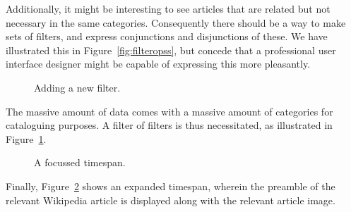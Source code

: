 Additionally, it might be interesting to see articles that are related but not 
necessary in the same categories. Consequently there should be a way to make 
sets of filters, and express conjunctions and disjunctions of these. We have 
illustrated this in Figure~\ref{fig:filteropss}, but concede that a 
professional user interface designer might be capable of expressing this more 
pleasantly.

\begin{figure}[H]
  \centering
  \begin{scale}{0.5}
    
  \end{scale}
  \caption{Adding a new filter.}
  \label{fig:filters}
\end{figure}

The massive amount of data comes with a massive amount of categories for 
cataloguing purposes. A filter of filters is thus necessitated, as illustrated 
in Figure~\ref{fig:filters}.

\begin{figure}[H]
  \centering
  \begin{scale}{0.3}
    
  \end{scale}
  \caption{A focussed timespan.}
  \label{fig:focussed}
\end{figure}

Finally, Figure~\ref{fig:focussed} shows an expanded timespan, wherein the 
preamble of the relevant Wikipedia article is displayed along with the 
relevant article image.
